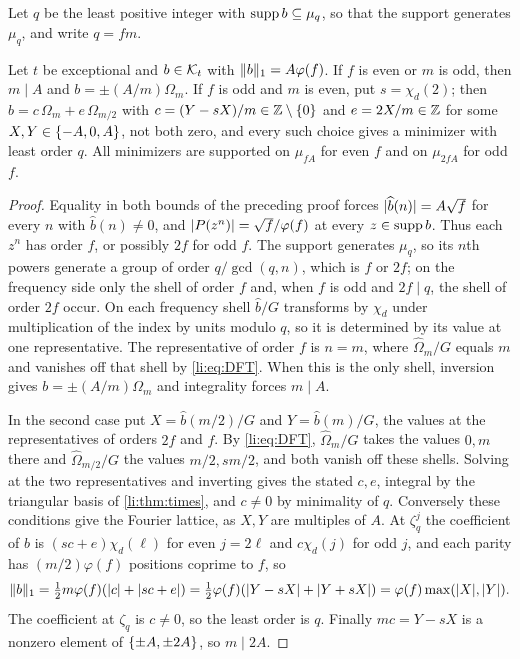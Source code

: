 Let $q$ be the least positive integer with $\operatorname{supp} b\subseteq\mu_q$, so that the support generates $\mu_q$, and write
$q=fm$.

\begin{theorem}\label{li:thm:eq}
Let $t$ be exceptional and $b\in\mathcal{K}_t$ with $\lVert b\rVert_1=A\varphi(f)$. If $f$ is even or $m$ is odd, then $m\mid A$ and
$b=\pm(A/m)\Omega_m$. If $f$ is odd and $m$ is even, put $s=\chi_d(2)$; then $b=c\,\Omega_m+e\,\Omega_{m/2}$ with
$c=(Y-sX)/m\in\mathbb{Z}\setminus\{0\}$ and $e=2X/m\in\mathbb{Z}$ for some $X,Y\in\{-A,0,A\}$, not both zero, and every such choice
gives a minimizer with least order $q$. All minimizers are supported on $\mu_{fA}$ for even $f$ and on $\mu_{2fA}$ for
odd $f$.
\end{theorem}

\begin{proof}
Equality in both bounds of the preceding proof forces $\lvert\widehat b(n)\rvert=A\sqrt f$ for every $n$ with $\widehat b(n)\ne0$, and
$\lvert P(z^n)\rvert=\sqrt f/\varphi(f)$ at every $z\in\operatorname{supp} b$. Thus each $z^n$ has order $f$, or possibly $2f$ for odd $f$. The support
generates $\mu_q$, so its $n$th powers generate a group of order $q/\gcd(q,n)$, which is $f$ or $2f$; on the frequency
side only the shell of order $f$ and, when $f$ is odd and $2f\mid q$, the shell of order $2f$ occur. On each frequency
shell $\widehat b/G$ transforms by $\chi_d$ under multiplication of the index by units modulo $q$, so it is determined by its
value at one representative. The representative of order $f$ is $n=m$, where $\widehat\Omega_m/G$ equals $m$ and vanishes off that
shell by \eqref{li:eq:DFT}. When this is the only shell, inversion gives $b=\pm(A/m)\Omega_m$ and integrality forces $m\mid A$.

In the second case put $X=\widehat b(m/2)/G$ and $Y=\widehat b(m)/G$, the values at the representatives of orders $2f$ and
$f$. By \eqref{li:eq:DFT}, $\widehat\Omega_m/G$ takes the values $0,m$ there and $\widehat\Omega_{m/2}/G$ the values $m/2,sm/2$, and both vanish
off these shells. Solving at the two representatives and inverting gives the stated $c,e$, integral by the
triangular basis of \cref{li:thm:times}, and $c\ne0$ by minimality of $q$. Conversely these conditions give the
Fourier lattice, as $X,Y$ are multiples of $A$. At $\zeta_q^j$ the coefficient of $b$ is $(sc+e)\chi_d(\ell)$ for even $j=2\ell$
and $c\chi_d(j)$ for odd $j$, and each parity has $(m/2)\varphi(f)$ positions coprime to $f$, so
\[
 \lVert b\rVert_1=\tfrac12m\varphi(f)(\lvert c\rvert+\lvert sc+e\rvert)=\tfrac12\varphi(f)(\lvert Y-sX\rvert+\lvert Y+sX\rvert)=\varphi(f)\max(\lvert X\rvert,\lvert Y\rvert).
\]
The coefficient at $\zeta_q$ is $c\ne0$, so the least order is $q$. Finally $mc=Y-sX$ is a nonzero element of
$\{\pm A,\pm2A\}$, so $m\mid2A$.
\end{proof}

